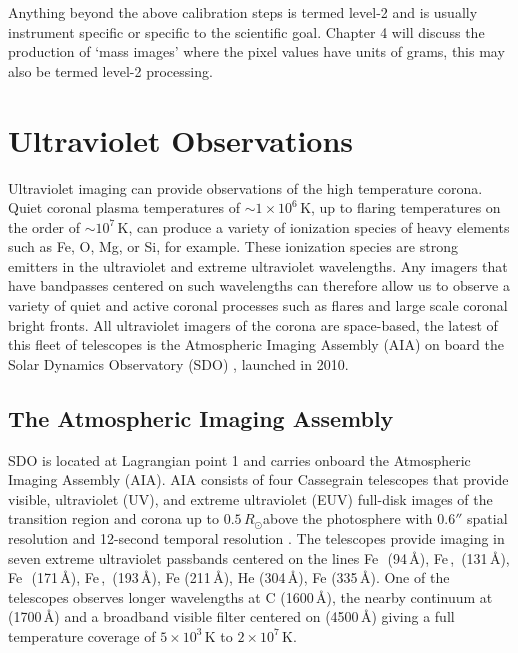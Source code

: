 Anything beyond the above calibration steps is termed level-2 and is usually instrument specific or specific to the scientific goal. Chapter 4 will discuss the production of `mass images' where the pixel values have units of grams, this may also be termed level-2 processing.


\section{Ultraviolet Observations}\label{sec:4}

Ultraviolet imaging can provide observations of the high temperature corona. Quiet coronal plasma temperatures of $\sim$$1\times10^6$\,K, up to flaring temperatures on the order of $\sim$$10^{7}$\,K, can produce a variety of ionization species of heavy elements such as Fe, O, Mg, or Si, for example. These ionization species are strong emitters in the ultraviolet and extreme ultraviolet wavelengths.
Any imagers that have bandpasses centered on such wavelengths can therefore allow us to observe a variety of quiet and active coronal processes such as flares and large scale coronal bright fronts. All ultraviolet imagers of the corona are space-based, the latest of this fleet of telescopes is the Atmospheric Imaging Assembly (AIA) on board the Solar Dynamics Observatory (SDO) \citep{lemen2012}, launched in 2010.

\subsection{The Atmospheric Imaging Assembly}\label{sec:40}

SDO is located at Lagrangian point 1 and carries onboard the Atmospheric Imaging Assembly (AIA). AIA consists of four Cassegrain telescopes that provide visible, ultraviolet (UV), and extreme ultraviolet (EUV) full-disk images of the transition region and corona up to $0.5\,R_{\odot}$above the photosphere with 0.6$''$ spatial resolution and 12-second temporal resolution \citep{lemen2012}. The telescopes provide imaging in seven extreme ultraviolet passbands centered on the lines Fe\, \,(94\,\AA), Fe\,, \,(131\,\AA), Fe\, \,(171\,\AA), Fe\,, \,(193\,\AA), Fe\,\,(211\,\AA), He\,\,(304\,\AA), Fe\,\,(335\,\AA). One of the telescopes observes longer wavelengths at C\,\,(1600\,\AA), the nearby continuum at (1700\,\AA) and a broadband visible filter centered on (4500\,\AA)  giving a full temperature coverage of $5\times10^3$\,K to $2\times10^7$\,K.


